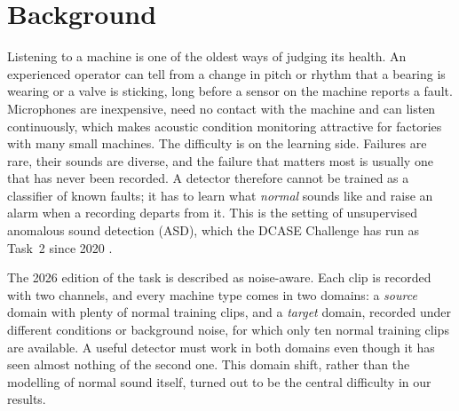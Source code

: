 \section{Background}
Listening to a machine is one of the oldest ways of judging its health. An experienced operator can tell from a change in pitch or rhythm that a bearing is wearing or a valve is sticking, long before a sensor on the machine reports a fault. Microphones are inexpensive, need no contact with the machine and can listen continuously, which makes acoustic condition monitoring attractive for factories with many small machines. The difficulty is on the learning side. Failures are rare, their sounds are diverse, and the failure that matters most is usually one that has never been recorded. A detector therefore cannot be trained as a classifier of known faults; it has to learn what \emph{normal} sounds like and raise an alarm when a recording departs from it. This is the setting of unsupervised anomalous sound detection (ASD), which the DCASE Challenge has run as Task~2 since 2020 \cite{koizumi2020,dohi2023}.

The 2026 edition of the task \cite{dcase2026task2} is described as noise-aware. Each clip is recorded with two channels, and every machine type comes in two domains: a \emph{source} domain with plenty of normal training clips, and a \emph{target} domain, recorded under different conditions or background noise, for which only ten normal training clips are available. A useful detector must work in both domains even though it has seen almost nothing of the second one. This domain shift, rather than the modelling of normal sound itself, turned out to be the central difficulty in our results.

